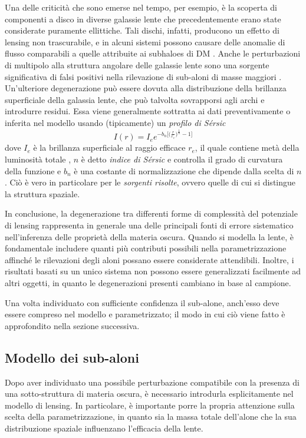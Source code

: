 Una delle criticità che sono emerse nel tempo, per esempio, è la scoperta di componenti a disco in diverse galassie lente che precedentemente erano state considerate puramente ellittiche. Tali dischi, infatti, producono un effetto di lensing non trascurabile, e in alcuni sistemi possono causare delle anomalie di flusso comparabili a quelle attribuite ai subhaloes di DM \parencite{Hsueh2017}. Anche le perturbazioni di multipolo alla struttura angolare delle galassie lente sono una sorgente significativa di falsi positivi nella rilevazione di sub-aloni di masse maggiori \parencite{VegettiORiordan2024}.  Un'ulteriore degenerazione può essere dovuta alla distribuzione della brillanza superficiale della galassia lente, che può talvolta sovrapporsi agli archi e introdurre residui.
Essa viene generalmente sottratta ai dati preventivamente o inferita nel modello usando (tipicamente) un \emph{profilo di Sérsic}
\begin{equation}
    I(r)=I_e e^{-b_n\Big[\Big(\frac{r}{r_e}\Big)^{\frac{1}{n}}-1\Big]}
    \label{eq:Sersic}
\end{equation}
dove $I_e$ è la brillanza superficiale al raggio efficace $r_e$, il quale contiene metà della luminosità totale , $n$ è detto \emph{indice di Sérsic} e controlla il grado di curvatura della funzione e $b_n$ è una costante di normalizzazione che dipende dalla scelta di $n$. Ciò è vero in particolare per le \emph{sorgenti risolte}, ovvero quelle di cui si distingue la struttura spaziale.

In conclusione, la degenerazione tra differenti forme di complessità del potenziale di lensing rappresenta in generale una delle principali fonti di errore sistematico nell'inferenza delle proprietà della materia oscura.  Quando si modella la lente, è fondamentale includere quanti più contributi possibili nella parametrizzazione affinché le rilevazioni degli aloni possano essere considerate attendibili.
Inoltre, i risultati basati su un unico sistema non possono essere generalizzati facilmente ad altri oggetti, in quanto le degenerazioni presenti cambiano in base al campione. 

Una volta individuato con sufficiente confidenza il sub-alone, anch'esso deve essere compreso nel modello e parametrizzato; il modo in cui ciò viene fatto è approfondito nella sezione successiva.

\subsection{Modello dei sub-aloni}
Dopo aver individuato una possibile perturbazione compatibile con la presenza di una sotto-struttura di materia oscura, è necessario introdurla esplicitamente nel modello di lensing. In particolare, è importante porre la propria attenzione sulla scelta della parametrizzazione, in quanto sia la massa totale dell'alone che la sua distribuzione spaziale influenzano l'efficacia della lente.

